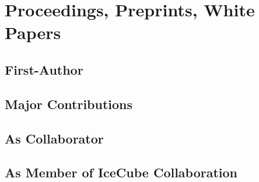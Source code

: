 \documentclass[a4paper,10pt]{article} %
\begin{document}
\bigskip
\clearpage


\section*{Proceedings, Preprints, White Papers}

\subsection*{First-Author}

\begin{refsection}
	
	\nocite{*}
	\printbibliography[heading=none]
	
\end{refsection}

\subsection*{Major Contributions}

\begin{refsection}
	
	\nocite{*}
	\printbibliography[heading=none]
	
\end{refsection}

\subsection*{As Collaborator}

\begin{refsection}
	
	\nocite{*}
	\printbibliography[heading=none]
	
\end{refsection}

\subsection*{As Member of IceCube Collaboration}

\begin{refsection}[proc_ic]
	
	\nocite{*}
	\printbibliography[heading=none]
	
\end{refsection}
\end{document}
